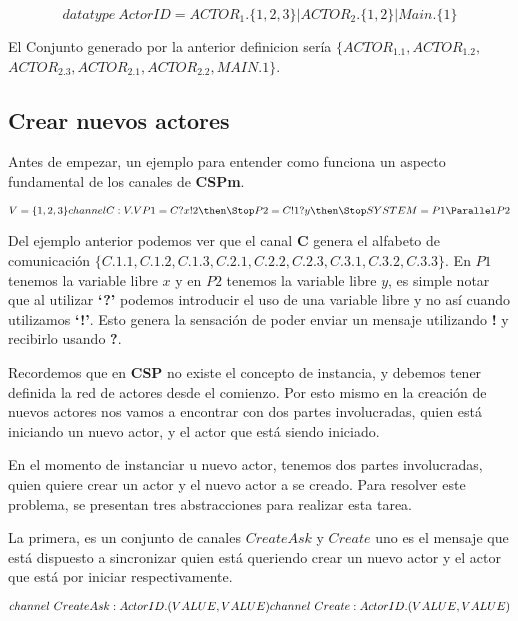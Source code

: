 \documentclass[fleqn]{article}
\begin{document}
\[
  \label{ActorID}
  datatype\ ActorID = ACTOR_1.\{1, 2, 3\} | ACTOR_2.\{1, 2\} | Main.\{1\}
\]

El Conjunto generado por la anterior definicion sería $\{ACTOR_1.1, ACTOR_1.2, $ \\
$ ACTOR_2.3, ACTOR_2.1 , ACTOR_2.2, MAIN.1\}$.

\subsection{Crear nuevos actores}

Antes de empezar, un ejemplo para entender como funciona un aspecto fundamental
de los canales de \textbf{CSPm}. 

\[
V = \{1,2,3\} \\
channel C:V.V \\
P1 = C?x!2 \then \Stop \\
P2 = C!1?y \then \Stop \\
SYSTEM = P1 \Parallel P2
\]

Del ejemplo anterior podemos ver que el canal \textbf{C} genera el alfabeto de
comunicación $\{ C.1.1, C.1.2, C.1.3, C.2.1, C.2.2, C.2.3, C.3.1, C.3.2, C.3.3 \}$.
En $P1$ tenemos la variable libre $x$ y en $P2$ tenemos la variable libre $y$,
es simple notar que al utilizar \textbf{`?'} podemos introducir el uso de una
variable libre y no así cuando utilizamos \textbf{`!'}.
Esto genera la sensación de poder enviar un mensaje utilizando \textbf{!} y
recibirlo usando \textbf{?}.

Recordemos que en \textbf{CSP} no existe el concepto de instancia, y debemos
tener definida la red de actores desde el comienzo.
Por esto mismo en la creación de nuevos actores nos vamos a encontrar con dos
partes involucradas, quien está iniciando un nuevo actor, y el actor que está
siendo iniciado.

En el momento de instanciar u nuevo actor, tenemos dos partes involucradas, quien
quiere crear un actor y el nuevo actor a se creado.
Para resolver este problema, se presentan tres abstracciones para realizar esta tarea. 

La primera, es un conjunto de canales $CreateAsk$ y $Create$ uno es el
mensaje que está dispuesto a sincronizar quien está queriendo crear un nuevo actor y el actor 
que está por iniciar respectivamente.

\[
channel\ CreateAsk:ActorID.(VALUE, VALUE)\\
channel\ Create:ActorID.(VALUE, VALUE)
\]
\end{document}

